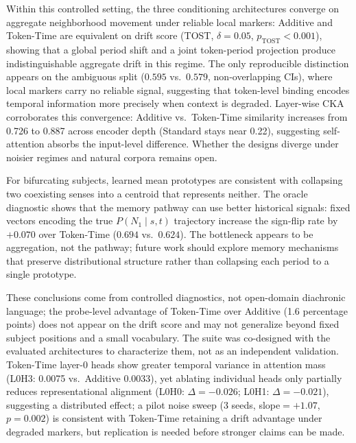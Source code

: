 \documentclass[runningheads]{llncs}
\begin{document}
Within this controlled setting, the three conditioning architectures converge
on aggregate neighborhood movement under reliable local markers: Additive and
Token-Time are equivalent on drift score (TOST, \(\delta=0.05\),
\(p_\mathrm{TOST}<0.001\)), showing that a global period shift and a joint
token-period projection produce indistinguishable aggregate drift in this regime.
The only reproducible distinction appears on the ambiguous split (\(0.595\)
vs.\ \(0.579\), non-overlapping CIs), where local markers carry no reliable signal,
suggesting that token-level binding encodes temporal information more precisely
when context is degraded. Layer-wise CKA corroborates this convergence:
Additive vs.\ Token-Time similarity increases from 0.726 to 0.887 across
encoder depth (Standard stays near 0.22), suggesting self-attention absorbs
the input-level difference. Whether the designs diverge under noisier regimes
and natural corpora remains open.

For bifurcating subjects, learned mean prototypes are consistent with collapsing two coexisting senses into a
centroid that represents neither. The oracle diagnostic shows that the memory pathway
can use better historical signals: fixed vectors encoding the true \(P(N_1 \mid s, t)\) trajectory
increase the sign-flip rate by \(+0.070\) over Token-Time (\(0.694\)
vs.\ \(0.624\)). The bottleneck appears to be aggregation, not the pathway; future work
should explore memory mechanisms that preserve distributional structure rather
than collapsing each period to a single prototype.

These conclusions come from controlled diagnostics, not open-domain diachronic
language; the probe-level advantage of Token-Time over Additive (1.6 percentage
points) does not appear on the drift score and may not generalize beyond fixed
subject positions and a small vocabulary. The suite was co-designed with the
evaluated architectures to characterize them, not as an independent validation.
Token-Time layer-0 heads show greater temporal variance in attention mass
(L0H3: 0.0075 vs.\ Additive 0.0033), yet ablating individual heads only
partially reduces representational alignment (L0H0: \(\Delta=-0.026\);
L0H1: \(\Delta=-0.021\)), suggesting a distributed effect; a pilot noise sweep
(3 seeds, slope\(=+1.07\), \(p=0.002\)) is consistent with Token-Time retaining
a drift advantage under degraded markers, but replication is needed before
stronger claims can be made.



\end{document}
